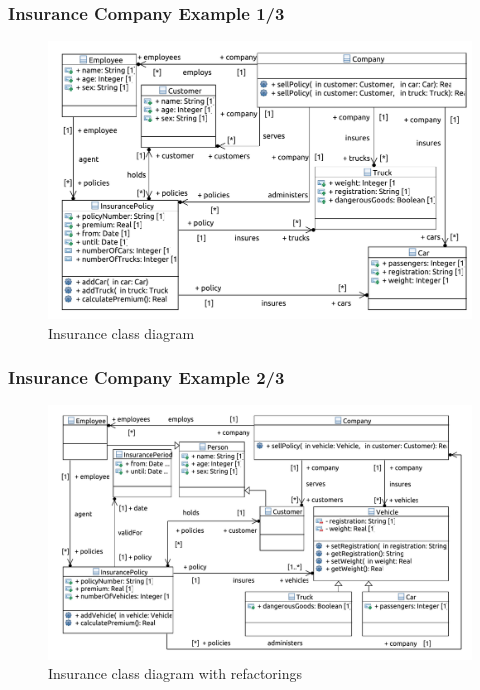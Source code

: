 \documentclass{beamer}
\begin{document}
\begin{frame}
\frametitle{Insurance Company Example 1/3}
\begin{figure}[h!t]
 \centering
 \includegraphics[scale=0.4]{images/insurance/Model_Model_ClassDiagram}
 \caption{Insurance class diagram}
 \label{fig:classdiagramcomplexRef}
\end{figure}
\end{frame}

        
\begin{frame}
\frametitle{Insurance Company Example 2/3}
\begin{figure}[h!t]
 \centering
 \includegraphics[scale=0.4]{images/insurance_ref/Model_Model_ClassDiagram}
 \caption{Insurance class diagram with refactorings}
 \label{fig:classdiagramcomplex}
\end{figure}
\end{frame}
\end{document}
